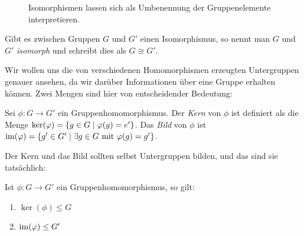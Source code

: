 {\begin{figure}[ht]
  \centering
  \caption{Isomorphismen lassen sich als Umbenennung der Gruppenelemente interpretieren.}
\end{figure}

Gibt es zwischen Gruppen $G$ und $G'$ einen Isomorphismus, so nennt man $G$ und $G'$ \emph{isomorph} und schreibt dies als $G \cong G'$.

Wir wollen uns die von verschiedenen Homomorphismen erzeugten Untergruppen genauer ansehen, da wir darüber Informationen über eine Gruppe erhalten können. Zwei Mengen sind hier von entscheidender Bedeutung:

\begin{definition}
  Sei $\phi \colon G \rightarrow G'$ ein Gruppenhomomorphismus. Der \emph{Kern} von $\phi$ ist definiert als die Menge $\ker(\phi) = \left\{ g \in G \suchthat \phi(g)=e' \right\}$. Das \emph{Bild} von $\phi$ ist $\img(\phi) = \left\{ g' \in G' \suchthat \exists g \in G \text{ mit } \phi(g)=g'\right\}$.
\end{definition}

Der Kern und das Bild sollten selbst Untergruppen bilden, und das sind sie tatsächlich:

\begin{proposition}
  Ist $\phi \colon G \rightarrow G'$ ein Gruppenhomomorphismus, so gilt:
  \begin{enumerate}[label=\alph*)]
    \item $\ker(\phi) \leq G$
    \item $\operatorname{im}(\varphi) \leq G'$
  \end{enumerate}
\end{proposition}

}
